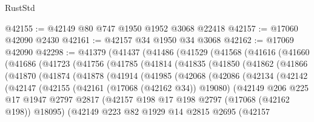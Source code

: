 \begin{lexlean}{RustStd}
\begin{coremodule}
@42155 := @42149 @80 @747 @1950 @1952 @3068 @22418
@42157 := @17060 @42090 @2430
@42161 := @42157 @34 @1950 @34 @3068
@42162 := @17069 @42090
@42298 := @41379
    (@41437
      (@41486
        (@41529
          (@41568
            (@41616
              (@41660
                (@41686
                  (@41723
                    (@41756
                      (@41785
                        (@41814
                          (@41835
                            (@41850
                              (@41862
                                (@41866
                                  (@41870
                                    (@41874
                                      (@41878
                                        (@41914
                                          (@41985
                                            (@42068
                                              (@42086
                                                (@42134
                                                  (@42142
                                                    (@42147
                                                      (@42155
                                                        (@42161 (@17068 (@42162 @34)) @19080)
                                                        (@42149
                                                          @206
                                                          @225
                                                          @17
                                                          @1947
                                                          @2797
                                                          @2817
                                                          (@42157
                                                            @198
                                                            @17
                                                            @198
                                                            @2797
                                                            (@17068 (@42162 @198))
                                                            @18095)
                                                          (@42149
                                                            @223
                                                            @82
                                                            @1929
                                                            @14
                                                            @2815
                                                            @2695
                                                            (@42157

\end{coremodule}
\end{lexlean}

